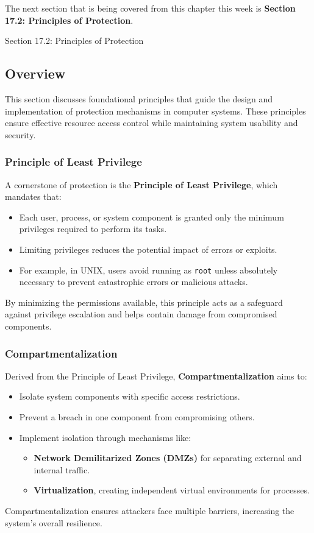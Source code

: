 The next section that is being covered from this chapter this week is \textbf{Section 17.2: Principles of Protection}.

\begin{notes}{Section 17.2: Principles of Protection}
    \subsection*{Overview}

    This section discusses foundational principles that guide the design and implementation of protection mechanisms in computer systems. These principles ensure effective resource access control while 
    maintaining system usability and security.
    
    \subsubsection*{Principle of Least Privilege}
    
    A cornerstone of protection is the \textbf{Principle of Least Privilege}, which mandates that:
    \begin{itemize}
        \item Each user, process, or system component is granted only the minimum privileges required to perform its tasks.
        \item Limiting privileges reduces the potential impact of errors or exploits.
        \item For example, in UNIX, users avoid running as \texttt{root} unless absolutely necessary to prevent catastrophic errors or malicious attacks.
    \end{itemize}
    By minimizing the permissions available, this principle acts as a safeguard against privilege escalation and helps contain damage from compromised components.
    
    \subsubsection*{Compartmentalization}
    
    Derived from the Principle of Least Privilege, \textbf{Compartmentalization} aims to:
    \begin{itemize}
        \item Isolate system components with specific access restrictions.
        \item Prevent a breach in one component from compromising others.
        \item Implement isolation through mechanisms like:
        \begin{itemize}
            \item \textbf{Network Demilitarized Zones (DMZs)} for separating external and internal traffic.
            \item \textbf{Virtualization}, creating independent virtual environments for processes.
        \end{itemize}
    \end{itemize}
    Compartmentalization ensures attackers face multiple barriers, increasing the system's overall resilience.
    

\end{notes}
